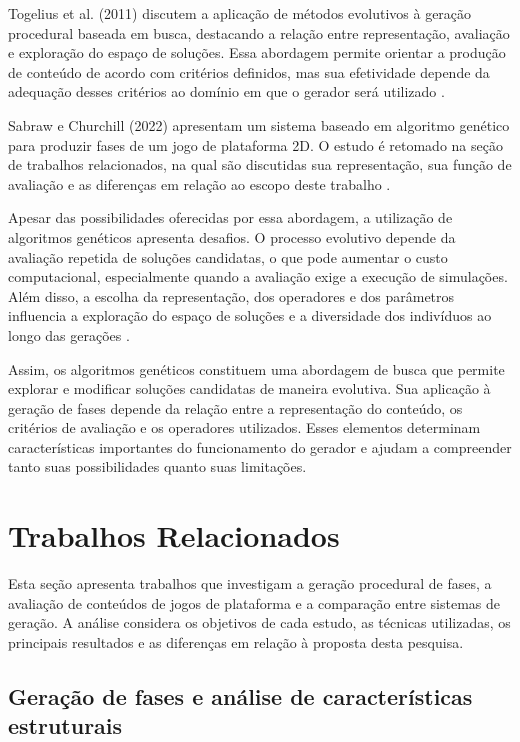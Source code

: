 Togelius et al. (2011) discutem a aplicação de
métodos evolutivos à geração procedural baseada
em busca, destacando a relação entre representação,
avaliação e exploração do espaço de soluções.
Essa abordagem permite orientar a produção de
conteúdo de acordo com critérios definidos,
mas sua efetividade depende da adequação desses
critérios ao domínio em que o gerador será utilizado
\cite{Togelius2011}.

Sabraw e Churchill (2022) apresentam um sistema
baseado em algoritmo genético para produzir fases
de um jogo de plataforma 2D. O estudo é retomado
na seção de trabalhos relacionados, na qual são
discutidas sua representação, sua função de
avaliação e as diferenças em relação ao escopo
deste trabalho \cite{SabrawChurchill2022}.

Apesar das possibilidades oferecidas por essa
abordagem, a utilização de algoritmos genéticos
apresenta desafios. O processo evolutivo depende
da avaliação repetida de soluções candidatas,
o que pode aumentar o custo computacional,
especialmente quando a avaliação exige a execução
de simulações. Além disso, a escolha da representação,
dos operadores e dos parâmetros influencia a
exploração do espaço de soluções e a diversidade
dos indivíduos ao longo das gerações
\cite{Togelius2011,EibenSmith2003}.

Assim, os algoritmos genéticos constituem uma
abordagem de busca que permite explorar e modificar
soluções candidatas de maneira evolutiva. Sua
aplicação à geração de fases depende da relação
entre a representação do conteúdo, os critérios
de avaliação e os operadores utilizados. Esses
elementos determinam características importantes
do funcionamento do gerador e ajudam a compreender
tanto suas possibilidades quanto suas limitações.

\section{Trabalhos Relacionados}
\label{sec:trabalhos-relacionados}

Esta seção apresenta trabalhos que investigam a geração
procedural de fases, a avaliação de conteúdos de jogos
de plataforma e a comparação entre sistemas de geração.
A análise considera os objetivos de cada estudo, as
técnicas utilizadas, os principais resultados e as
diferenças em relação à proposta desta pesquisa.

\subsection{Geração de fases e análise de características estruturais}

